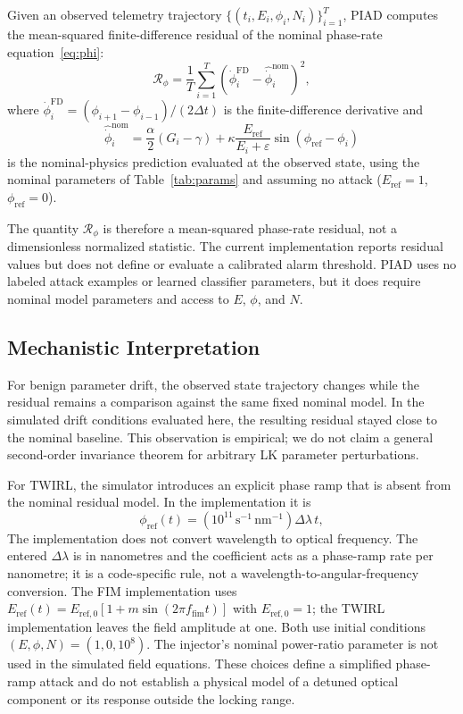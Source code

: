 \documentclass[journal,twocolumn]{IEEEtran}
\newcommand{\Rphase}{\mathcal{R}_{\!\phi}}
\newcommand{\Eref}{E_{\mathrm{ref}}}
\newcommand{\phiref}{\phi_{\mathrm{ref}}}
\newcommand{\kap}{\kappa}
\newcommand{\gam}{\gamma}
\begin{document}
Given an observed telemetry trajectory
$\{(t_i,E_i,\phi_i,N_i)\}_{i=1}^{T}$, PIAD computes the mean-squared finite-difference
residual of the nominal phase-rate equation~\eqref{eq:phi}:
\begin{equation}
  \Rphase = \frac{1}{T}\sum_{i=1}^{T}
    \left(\dot{\phi}_i^{\mathrm{FD}}-
          \hat{\dot{\phi}}_i^{\mathrm{nom}}\right)^2,
  \label{eq:residual}
\end{equation}
where
$\dot{\phi}_i^{\mathrm{FD}}=(\phi_{i+1}-\phi_{i-1})/(2\Delta t)$ is the finite-difference
derivative and
\begin{equation}
  \hat{\dot{\phi}}_i^{\mathrm{nom}} = \frac{\alpha}{2}(G_i-\gam)
    +\kap\frac{\Eref}{E_i+\varepsilon}
    \sin(\phiref-\phi_i)
  \label{eq:phinom}
\end{equation}
is the nominal-physics prediction evaluated at the observed state, using the
nominal parameters of Table~\ref{tab:params} and assuming no attack
($\Eref=1$, $\phiref=0$).

The quantity $\Rphase$ is therefore a mean-squared phase-rate residual, not a
dimensionless normalized statistic. The current implementation reports residual
values but does not define or evaluate a calibrated alarm threshold. PIAD uses no
labeled attack examples or learned classifier parameters, but it does require nominal
model parameters and access to $E$, $\phi$, and $N$.

\subsection{Mechanistic Interpretation}

For benign parameter drift, the observed state trajectory changes while the residual
remains a comparison against the same fixed nominal model. In the simulated drift
conditions evaluated here, the resulting residual stayed close to the nominal
baseline. This observation is empirical; we do not claim a general second-order
invariance theorem for arbitrary LK parameter perturbations.

For TWIRL, the simulator introduces an explicit phase ramp that is absent from the
nominal residual model. In the implementation it is
\begin{equation}
  \phiref(t)=
  \left(10^{11}\,\mathrm{s}^{-1}\,\mathrm{nm}^{-1}\right)\Delta\lambda\,t,
\end{equation}
The implementation does not convert wavelength to optical frequency. The entered
$\Delta\lambda$ is in nanometres and the coefficient acts as a phase-ramp rate per
nanometre; it is a code-specific rule, not a wavelength-to-angular-frequency
conversion. The FIM implementation uses
$E_{\mathrm{ref}}(t)=E_{\mathrm{ref},0}[1+m\sin(2\pi f_{\mathrm{fim}}t)]$ with
$E_{\mathrm{ref},0}=1$; the TWIRL implementation leaves the field amplitude at one.
Both use initial conditions $(E,\phi,N)=(1,0,10^8)$. The injector's
nominal power-ratio parameter is not used in the simulated field equations. These
choices define a simplified phase-ramp attack and do not establish a physical model
of a detuned optical component or its response outside the locking range.
\end{document}
